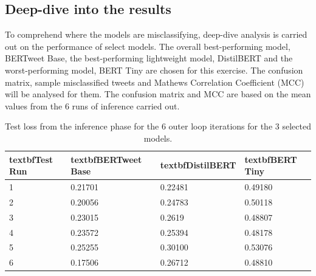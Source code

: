 \subsection{Deep-dive into the results}
To comprehend where the models are misclassifying, deep-dive analysis is carried out on the performance of select models. The overall best-performing model, BERTweet Base, the best-performing lightweight model, DistilBERT and the worst-performing model, BERT Tiny are chosen for this exercise. The confusion matrix, sample misclassified tweets and Mathews Correlation Coefficient (MCC) will be analysed for them. The confusion matrix and MCC are based on the mean values from the 6 runs of inference carried out.
\begin{table}[ht]
    \centering
    \begin{tabularx}{\textwidth}{|X|X|X|X|}
        \hline
        \rowcolor[gray]{0.7}
        textbf{Test Run} & textbf{BERTweet Base} & textbf{DistilBERT} & textbf{BERT Tiny} \\
        \hline
        1                & 0.21701               & 0.22481            & 0.49180           \\
        \rowcolor[gray]{0.9}
        2                & 0.20056               & 0.24783            & 0.50118           \\
        3                & 0.23015               & 0.2619             & 0.48807           \\
        \rowcolor[gray]{0.9}
        4                & 0.23572               & 0.25394            & 0.48178           \\
        5                & 0.25255               & 0.30100            & 0.53076           \\
        \rowcolor[gray]{0.9}
        6                & 0.17506               & 0.26712            & 0.48810           \\
        \hline
    \end{tabularx}
    \caption{Test loss from the inference phase for the 6 outer loop iterations for the 3 selected models.}
    \label{tab: test_loss}
\end{table}




